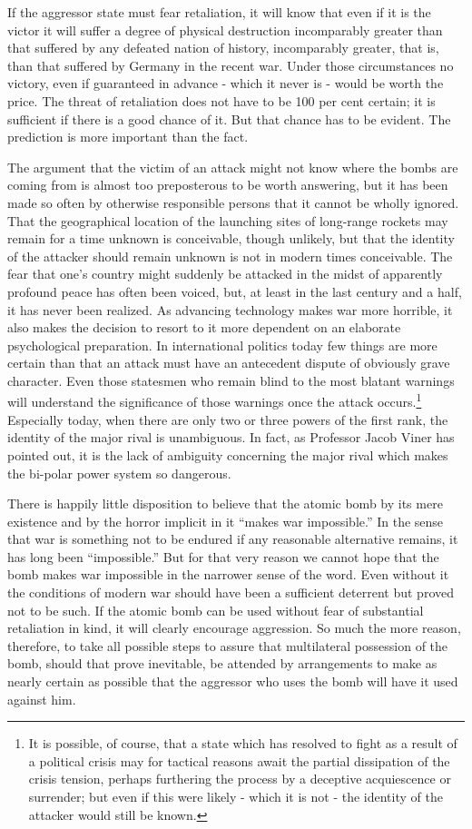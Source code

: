 If the aggressor state must fear retaliation, it will know that even if it is the victor it will suffer a degree of physical destruction incomparably greater than that suffered by any defeated nation of history, incomparably greater, that is, than that suffered by Germany in the recent war. Under those circumstances no victory, even if guaranteed in advance - which it never is - would be worth the price. The threat of retaliation does not have to be 100 per cent certain; it is sufficient if there is a good chance of it. But that chance has to be evident. The prediction is more important than the fact.

The argument that the victim of an attack might not know where the bombs are coming from is almost too preposterous to be worth answering, but it has been made so often by otherwise responsible persons that it cannot be wholly ignored. That the geographical location of the launching sites of long-range rockets may remain for a time unknown is conceivable, though unlikely, but that the identity of the attacker should remain unknown is not in modern times conceivable. The fear that one's country might suddenly be attacked in the midst of apparently profound peace has often been voiced, but, at least in the last century and a half, it has never been realized. As advancing technology makes war more horrible, it also makes the decision to resort to it more dependent on an elaborate psychological preparation. In international politics today few things are more certain than that an attack must have an antecedent dispute of obviously grave character. Even those statesmen who remain blind to the most blatant warnings will understand the significance of those warnings once the attack occurs.\footnote{It is possible, of course, that a state which has resolved to fight as a result of a political crisis may for tactical reasons await the partial dissipation of the crisis tension, perhaps furthering the process by a deceptive acquiescence or surrender; but even if this were likely - which it is not - the identity of the attacker would still be known.} Especially today, when there are only two or three powers of the first rank, the identity of the major rival is unambiguous. In fact, as Professor Jacob Viner has pointed out, it is the lack of ambiguity concerning the major rival which makes the bi-polar power system so dangerous.

There is happily little disposition to believe that the atomic bomb by its mere existence and by the horror implicit in it ``makes war impossible.'' In the sense that war is something not to be endured if any reasonable alternative remains, it has long been ``impossible.'' But for that very reason we cannot hope that the bomb makes war impossible in the narrower sense of the word. Even without it the conditions of modern war should have been a sufficient deterrent but proved not to be such. If the atomic bomb can be used without fear of substantial retaliation in kind, it will clearly encourage aggression. So much the more reason, therefore, to take all possible steps to assure that multilateral possession of the bomb, should that prove inevitable, be attended by arrangements to make as nearly certain as possible that the aggressor who uses the bomb will have it used against him.

